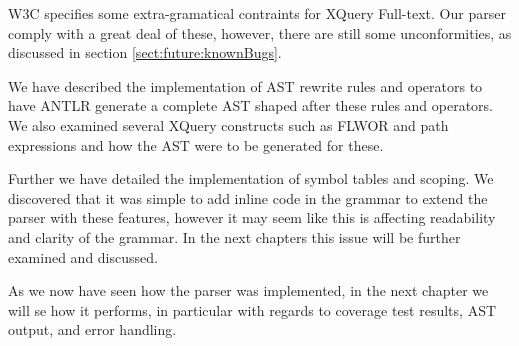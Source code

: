 W3C specifies some extra-gramatical contraints for XQuery Full-text. Our parser
comply with a great deal of these, however, there are still some
unconformities, as discussed in section \ref{sect:future:knownBugs}.  

We have described the implementation of AST rewrite rules and operators to have
ANTLR generate a complete AST shaped after these rules and operators. We also
examined several XQuery constructs such as FLWOR and path expressions and how
the AST were to be generated for these.

Further we have detailed the implementation of symbol tables and scoping. We
discovered that it was simple to add inline code in the grammar to extend the
parser with these features, however it may seem like this is affecting
readability and clarity of the grammar. In the next chapters this issue will be
further examined and discussed.

As we now have seen how the parser was implemented, in the next chapter we will
se how it performs, in particular with regards to coverage test results, AST
output, and error handling.
